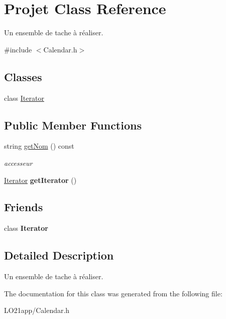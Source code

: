 \hypertarget{class_projet}{}\section{Projet Class Reference}
\label{class_projet}


Un ensemble de tache à réaliser.  




{\ttfamily \#include $<$Calendar.\+h$>$}

\subsection*{Classes}
\begin{DoxyCompactItemize}
\item 
class \hyperlink{class_projet_1_1_iterator}{Iterator}
\end{DoxyCompactItemize}
\subsection*{Public Member Functions}
\begin{DoxyCompactItemize}
\item 
\hypertarget{class_projet_abc4ef9586bab910e754d4f88943df720}{}string \hyperlink{class_projet_abc4ef9586bab910e754d4f88943df720}{get\+Nom} () const \label{class_projet_abc4ef9586bab910e754d4f88943df720}

\begin{DoxyCompactList}\small\item\em accesseur \end{DoxyCompactList}\item 
\hypertarget{class_projet_acb3ac5233074e53f0263bd50b4e0bdec}{}\hyperlink{class_projet_1_1_iterator}{Iterator} {\bfseries get\+Iterator} ()\label{class_projet_acb3ac5233074e53f0263bd50b4e0bdec}

\end{DoxyCompactItemize}
\subsection*{Friends}
\begin{DoxyCompactItemize}
\item 
\hypertarget{class_projet_a9830fc407400559db7e7783cc10a9394}{}class {\bfseries Iterator}\label{class_projet_a9830fc407400559db7e7783cc10a9394}

\end{DoxyCompactItemize}


\subsection{Detailed Description}
Un ensemble de tache à réaliser. 

The documentation for this class was generated from the following file\+:\begin{DoxyCompactItemize}
\item 
L\+O21app/Calendar.\+h\end{DoxyCompactItemize}

